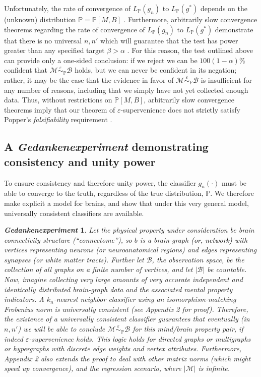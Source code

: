 \documentclass{article}
\newcommand{\mB}{\mathcal{B}}
\newcommand{\mM}{\mathcal{M}}
\newcommand{\PP}{\mathbb{P}}           %
\newcommand{\MeB}{\mM \overset{\varepsilon}{{\sim}}_{\PP} \mB}
\providecommand{\tr}[1]{\textcolor{black}{#1}}
\newtheorem{thex}{\emph{Gedankenexperiment}}
\begin{document}
Unfortunately, the rate of convergence of $L_{\PP}(g_n)$ to $L_{\PP}(g^*)$ depends on the (unknown) distribution $\PP=\PP[M,B]$ \cite{DGL96}. Furthermore, arbitrarily slow convergence theorems regarding the rate of convergence of $L_{\PP}(g_n)$ to $L_{\PP}(g^*)$ demonstrate that there is no universal $n,n'$ which will guarantee that the test has power greater than any specified target $\beta > \alpha$ \cite{Devroye83}. For this reason, the test outlined above can provide only a one-sided conclusion: if we reject we can be $100(1-\alpha)$\% confident that $\MeB$ holds, but we can never be confident in its negation; rather, it may be the case that the evidence in favor of $\MeB$ is insufficient for any number of reasons, including that we simply have not yet collected enough data. Thus, without restrictions on $\PP[M,B]$, arbitrarily slow convergence theorems imply that our theorem of $\varepsilon$-supervenience does not \tr{strictly} satisfy Popper's {\it falsifiability} requirement \cite{Popper}.


\subsection*{A \emph{Gedankenexperiment} demonstrating consistency and unity power} %
\label{sub:uc}

To ensure consistency and therefore unity power, the classifier $g_n(\cdot)$ must be able to converge to the truth, regardless of the true distribution, $\PP$.  We therefore make explicit a model for brains, and show that under this very general model, universally consistent classifiers are available.

\begin{thex}
Let the physical property under consideration be brain connectivity structure (``connectome''), so $b$ is a brain-graph \tr{(or, network)} with vertices representing neurons (or neuroanatomical regions) and edges representing synapses (or white matter tracts). Further let $\mB$, the observation space, be the collection of all graphs on a finite number of vertices, and let $|\mB|$ be countable. Now, imagine collecting very large amounts of very accurate independent and identically distributed brain-graph data and the associated mental property indicators. A $k_n$-nearest neighbor classifier using an isomorphism-matching Frobenius norm is universally consistent (see Appendix 2 for proof). Therefore, %
the existence of a universally consistent classifier guarantees that eventually (in $n,n'$) we will be able to conclude $\MeB$ for this mind/brain property pair, if indeed $\varepsilon$-supervenience holds. This logic holds for directed graphs or multigraphs or hypergraphs with discrete edge weights and vertex attributes. Furthermore, Appendix 2 also extends the proof to deal with other matrix norms (which might speed up convergence), and the regression scenario, where $|\mM|$ is infinite.  
\end{thex}
\end{document}
